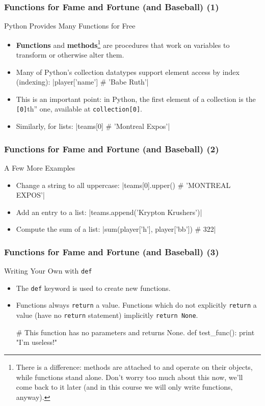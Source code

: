 \documentclass[10pt]{beamer}
\begin{document}
\begin{frame}[fragile]
  \frametitle{Functions for Fame and Fortune (and Baseball) (1)}
  \begin{block}{Python Provides Many Functions for Free}
    \begin{itemize}
      \item \textbf{Functions} and \textbf{methods}\footnote{There is a difference: methods are attached to and operate on their objects, while functions stand alone. Don't worry too much about this now, we'll come back to it later (and in this course we will only write functions, anyway).} are procedures that work on variables to transform or otherwise alter them.
      \item Many of Python's collection datatypes support element access by index (indexing):
        |player['name'] # 'Babe Ruth'|

      \item This is an important point: in Python, the first element of a collection is the \texttt{[0]}th'' one, available at \texttt{collection[0]}.
      \item Similarly, for lists:
        |teams[0] # 'Montreal Expos'|
    \end{itemize}
  \end{block}
\end{frame}

\begin{frame}[fragile]
  \frametitle{Functions for Fame and Fortune (and Baseball) (2)}
  \begin{block}{A Few More Examples}
    \begin{itemize}
      \item Change a string to all uppercase:
        |teams[0].upper() # 'MONTREAL EXPOS'|
      \item Add an entry to a list:
        |teams.append('Krypton Krushers')|
      \item Compute the sum of a list:
        |sum(player['h'], player['bb']) # 322|
    \end{itemize}
  \end{block}
\end{frame}

\begin{frame}[fragile]
  \frametitle{Functions for Fame and Fortune (and Baseball) (3)}
  \begin{block}{Writing Your Own with \texttt{def}}
    \begin{itemize}
      \item The \texttt{def} keyword is used to create new functions.
      \item Functions always \texttt{return} a value. 
        Functions which do not explicitly \texttt{return} a value (have no \texttt{return} statement) implicitly \texttt{return None}.
        \begin{pythoncode}
  # This function has no parameters and returns None.
  def test_func():
    print "I'm useless!"
        \end{pythoncode}
    \end{itemize}
  \end{block}
\end{frame}
\end{document}
